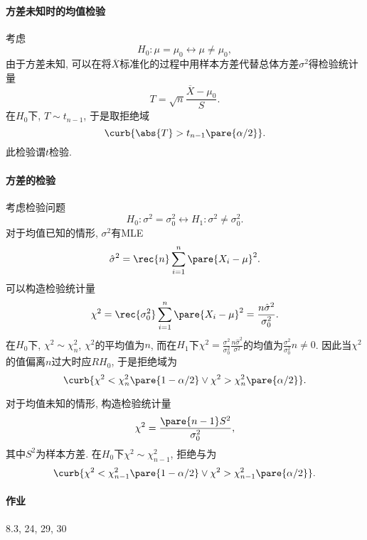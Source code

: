 \documentclass[../Statistics.tex]{subfiles}
\begin{document}
\paragraph{方差未知时的均值检验} %
\label{par:方差未知时的均值检验}

考虑
\[ H_0: \mu = \mu_0 \leftrightarrow \mu\neq \mu_0, \]
由于方差未知, 可以在将$\overbar{X}$标准化的过程中用样本方差代替总体方差$\sigma^2$得检验统计量
\[ T = \sqrt{n} \frac{\overbar{X} - \mu_0}{S}. \]
在$H_0$下, $T\sim t_{n-1}$, 于是取拒绝域
\[ \curb{\abs{T} > t_{n-1}\pare{\alpha/2}}. \]
此检验谓$t$检验.


\paragraph{方差的检验} %
\label{par:方差的检验}

考虑检验问题
\[ H_0: \sigma^2 = \sigma_0^2 \leftrightarrow H_1: \sigma^2 \neq \sigma_0^2. \]
对于均值已知的情形, $\sigma^2$有MLE
\[ \hat\sigma^2 = \rec{n}\sum_{i=1}^n \pare{X_i - \mu}^2. \]
可以构造检验统计量
\[ \chi^2 = \rec{\sigma_0^2} \sum_{i=1}^n \pare{X_i - \mu}^2 = \frac{n\hat\sigma^2}{\sigma_0^2}. \]
在$H_0$下, $\chi^2\sim \chi_n^2$, $\chi^2$的平均值为$n$, 而在$H_1$下$\displaystyle \chi^2 = \frac{\sigma^2}{\sigma_0^2}\frac{n\hat\sigma^2}{\sigma^2}$的均值为$\displaystyle \frac{\sigma^2}{\sigma_0^2}n \neq 0$. 因此当$\chi^2$的值偏离$n$过大时应$RH_0$, 于是拒绝域为
\[ \curb{\chi^2 < \chi_n^2\pare{1-\alpha/2}\lor \chi^2 > \chi_n^2\pare{\alpha/2}}. \]
\par
对于均值未知的情形, 构造检验统计量
\[ \chi^2 = \frac{\pare{n-1}S^2}{\sigma_0^2}, \]
其中$S^2$为样本方差. 在$H_0$下$\chi^2\sim \chi_{n-1}^2$, 拒绝与为
\[ \curb{\chi^2 < \chi_{n-1}^2\pare{1-\alpha/2}\lor \chi^2 > \chi_{n-1}^2\pare{\alpha/2}}. \]


\paragraph{作业} %
\label{par:作业}

8.3, 24, 29, 30

\end{document}
